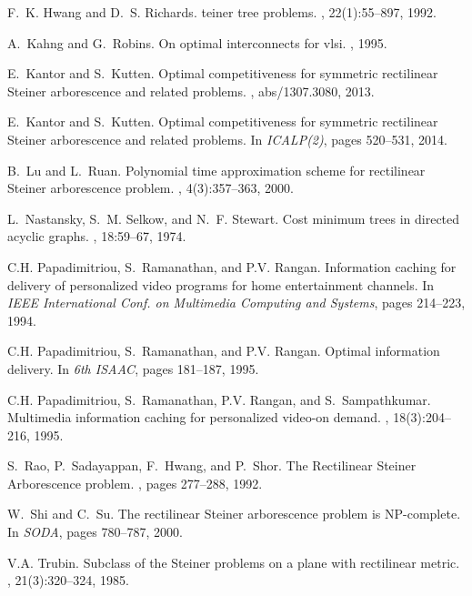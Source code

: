 \documentclass[11pt]{article}
\begin{document}
{\begin{thebibliography}{10}
F.~K. Hwang and D.~S. Richards.
teiner tree problems.
, 22(1):55--897, 1992.

A.~Kahng and G.~Robins.
\newblock On optimal interconnects for {\sc\large vlsi}.
, 1995.

E.~Kantor and S.~Kutten.
\newblock Optimal competitiveness for symmetric rectilinear {S}teiner
  arborescence and related problems.
, abs/1307.3080, 2013.

E.~Kantor and S.~Kutten.
\newblock Optimal competitiveness for symmetric rectilinear {S}teiner
  arborescence and related problems.
\newblock In {\em ICALP(2)}, pages 520--531, 2014.

B.~Lu and L.~Ruan.
\newblock Polynomial time approximation scheme for rectilinear {S}teiner
  arborescence problem.
, 4(3):357--363, 2000.

L.~Nastansky, S.~M. Selkow, and N.~F. Stewart.
\newblock Cost minimum trees in directed acyclic graphs.
, 18:59--67, 1974.

C.H. Papadimitriou, S.~Ramanathan, and P.V. Rangan.
\newblock Information caching for delivery of personalized video programs for
  home entertainment channels.
\newblock In {\em IEEE International Conf. on Multimedia Computing and
  Systems}, pages 214--223, 1994.

C.H. Papadimitriou, S.~Ramanathan, and P.V. Rangan.
\newblock Optimal information delivery.
\newblock In {\em 6th ISAAC}, pages 181--187, 1995.

C.H. Papadimitriou, S.~Ramanathan, P.V. Rangan, and S.~Sampathkumar.
\newblock Multimedia information caching for personalized video-on demand.
, 18(3):204--216, 1995.

S.~Rao, P.~Sadayappan, F.~Hwang, and P.~Shor.
\newblock The {R}ectilinear {S}teiner {A}rborescence problem.
, pages 277--288, 1992.

W.~Shi and C.~Su.
\newblock The rectilinear {S}teiner arborescence problem is {N}{P}-complete.
\newblock In {\em SODA}, pages 780--787, 2000.

V.A. Trubin.
\newblock Subclass of the {S}teiner problems on a plane with rectilinear
  metric.
, 21(3):320--324, 1985.

\end{thebibliography}


}
\end{document}
